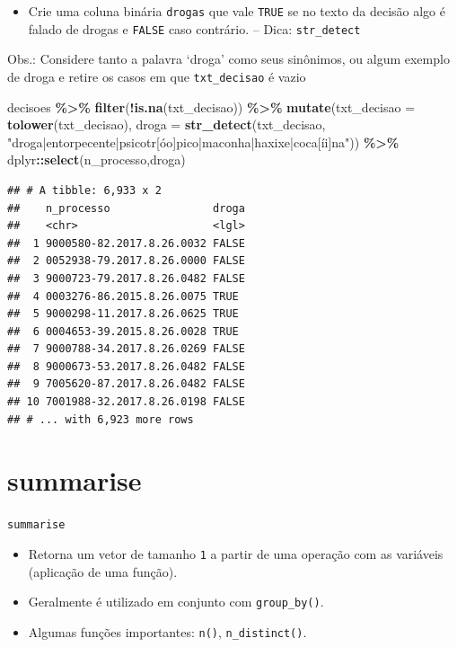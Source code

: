 \documentclass[
  10pt,
  ignorenonframetext,
]{beamer}
\newenvironment{Shaded}{\begin{snugshade}}{\end{snugshade}}
\newcommand{\DataTypeTok}[1]{\textcolor[rgb]{0.13,0.29,0.53}{#1}}
\newcommand{\KeywordTok}[1]{\textcolor[rgb]{0.13,0.29,0.53}{\textbf{#1}}}
\newcommand{\NormalTok}[1]{#1}
\newcommand{\OperatorTok}[1]{\textcolor[rgb]{0.81,0.36,0.00}{\textbf{#1}}}
\newcommand{\StringTok}[1]{\textcolor[rgb]{0.31,0.60,0.02}{#1}}
\providecommand{\tightlist}{%
  \setlength{\itemsep}{0pt}\setlength{\parskip}{0pt}}
\begin{document}
\begin{frame}[fragile]{}
\protect\hypertarget{section-2}{}
\begin{itemize}
\tightlist
\item
  Crie uma coluna binária \texttt{drogas} que vale \texttt{TRUE} se no
  texto da decisão algo é falado de drogas e \texttt{FALSE} caso
  contrário. -- Dica: \texttt{str\_detect}
\end{itemize}

Obs.: Considere tanto a palavra `droga' como seus sinônimos, ou algum
exemplo de droga e retire os casos em que \texttt{txt\_decisao} é vazio

\begin{Shaded}
\begin{Highlighting}[]
\NormalTok{decisoes }\OperatorTok{\%\textgreater{}\%}\StringTok{ }
\StringTok{  }\KeywordTok{filter}\NormalTok{(}\OperatorTok{!}\KeywordTok{is.na}\NormalTok{(txt\_decisao)) }\OperatorTok{\%\textgreater{}\%}\StringTok{ }
\StringTok{  }\KeywordTok{mutate}\NormalTok{(}\DataTypeTok{txt\_decisao =} \KeywordTok{tolower}\NormalTok{(txt\_decisao),}
         \DataTypeTok{droga =} \KeywordTok{str\_detect}\NormalTok{(txt\_decisao,}
    \StringTok{"droga|entorpecente|psicotr[óo]pico|maconha|haxixe|coca[íi]na"}\NormalTok{)) }\OperatorTok{\%\textgreater{}\%}
\StringTok{  }\NormalTok{dplyr}\OperatorTok{::}\KeywordTok{select}\NormalTok{(n\_processo,droga) }
\end{Highlighting}
\end{Shaded}

\begin{verbatim}
## # A tibble: 6,933 x 2
##    n_processo                droga
##    <chr>                     <lgl>
##  1 9000580-82.2017.8.26.0032 FALSE
##  2 0052938-79.2017.8.26.0000 FALSE
##  3 9000723-79.2017.8.26.0482 FALSE
##  4 0003276-86.2015.8.26.0075 TRUE 
##  5 9000298-11.2017.8.26.0625 TRUE 
##  6 0004653-39.2015.8.26.0028 TRUE 
##  7 9000788-34.2017.8.26.0269 FALSE
##  8 9000673-53.2017.8.26.0482 FALSE
##  9 7005620-87.2017.8.26.0482 FALSE
## 10 7001988-32.2017.8.26.0198 FALSE
## # ... with 6,923 more rows
\end{verbatim}
\end{frame}

\hypertarget{summarise}{%
\section{summarise}\label{summarise}}

\begin{frame}[fragile]{\texttt{summarise}}
\protect\hypertarget{summarise-1}{}
\begin{itemize}
\tightlist
\item
  Retorna um vetor de tamanho \texttt{1} a partir de uma operação com as
  variáveis (aplicação de uma função).
\item
  Geralmente é utilizado em conjunto com \texttt{group\_by()}.
\item
  Algumas funções importantes: \texttt{n()}, \texttt{n\_distinct()}.
\end{itemize}
\end{frame}
\end{document}
